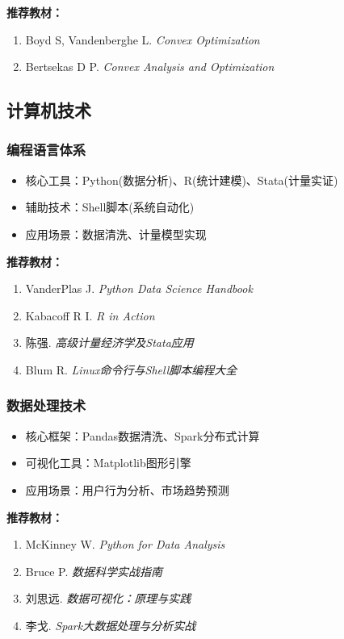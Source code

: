 \documentclass[lang=cn,12pt,a4paper]{elegantpaper}
\begin{document}
\noindent \textbf{推荐教材：}
\begin{enumerate}[leftmargin=*,nosep]
    \item Boyd S, Vandenberghe L. \textit{Convex Optimization}
    \item Bertsekas D P. \textit{Convex Analysis and Optimization}
\end{enumerate}

\subsection{计算机技术}
\subsubsection{编程语言体系}
\begin{itemize}[leftmargin=*,noitemsep]
    \item 核心工具：Python(数据分析)、R(统计建模)、Stata(计量实证)
    \item 辅助技术：Shell脚本(系统自动化)
    \item 应用场景：数据清洗、计量模型实现
\end{itemize}

\noindent \textbf{推荐教材：}
\begin{enumerate}[leftmargin=*,nosep]
    \item VanderPlas J. \textit{Python Data Science Handbook}
    \item Kabacoff R I. \textit{R in Action}
    \item 陈强. \textit{高级计量经济学及Stata应用}
    \item Blum R. \textit{Linux命令行与Shell脚本编程大全}
\end{enumerate}

\subsubsection{数据处理技术}
\begin{itemize}[leftmargin=*,noitemsep]
    \item 核心框架：Pandas数据清洗、Spark分布式计算
    \item 可视化工具：Matplotlib图形引擎
    \item 应用场景：用户行为分析、市场趋势预测
\end{itemize}

\noindent \textbf{推荐教材：}
\begin{enumerate}[leftmargin=*,nosep]
    \item McKinney W. \textit{Python for Data Analysis}
    \item Bruce P. \textit{数据科学实战指南}
    \item 刘思远. \textit{数据可视化：原理与实践}
    \item 李戈. \textit{Spark大数据处理与分析实战}
\end{enumerate}
\end{document}

